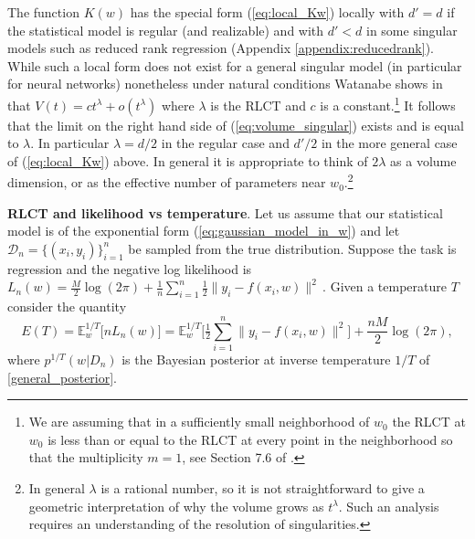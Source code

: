 \documentclass{article} %
\begin{document}
The function $K(w)$ has the special form (\ref{eq:local_Kw}) locally with $d' = d$ if the statistical model is regular (and realizable) and with $d' < d$ in some singular models such as reduced rank regression (Appendix \ref{appendix:reducedrank}). While such a local form does not exist for a general singular model (in particular for neural networks) nonetheless under natural conditions Watanabe shows in \citet[Theorem 7.1]{watanabe_algebraic_2009} that
$
V(t) = c t^\lambda + o( t^\lambda)
$
where $\lambda$ is the RLCT and $c$ is a constant.\footnote{We are assuming that in a sufficiently small neighborhood of $w_0$ the RLCT at $w_0$ is less than or equal to the RLCT at every point in the neighborhood so that the multiplicity $m = 1$, see Section 7.6 of \citep{watanabe_algebraic_2009}.} It follows that the limit on the right hand side of  (\ref{eq:volume_singular}) exists and is equal to $\lambda$. In particular $\lambda = d/2$ in the regular case and $d'/2$ in the more general case of (\ref{eq:local_Kw}) above. In general it is appropriate to think of $2 \lambda$ as a volume dimension, or as the effective number of parameters near $w_0$.\footnote{In general $\lambda$ is a rational number, so it is not straightforward to give a geometric interpretation of why the volume grows as $t^\lambda$. Such an analysis requires an understanding of the resolution of singularities.}


\textbf{RLCT and likelihood vs temperature}. Let us assume that our statistical model is of the exponential form  (\ref{eq:gaussian_model_in_w}) and let $\mathcal D_n = \{ (x_i,y_i) \}_{i=1}^n$ be sampled from the true distribution. Suppose the task is regression and the negative log likelihood is
$
L_n(w) = \frac{M}{2} \log(2\pi) + \frac{1}{n} \sum_{i=1}^n \frac{1}{2} \| y_i - f(x_i,w) \|^2\,.
$
Given a temperature $T$ consider the quantity
$$
E(T) = \mathbb{E}^{1/T}_w\big[nL_n(w) \big] = \mathbb{E}_w^{1/T}\Big[ \tfrac{1}{2} \sum_{i=1}^n \| y_i - f(x_i, w) \|^2 \Big] + \frac{nM}{2} \log(2\pi),
$$
where $p^{1/T}(w|D_n)$ is the Bayesian posterior at inverse temperature $1/T$ of \ref{general_posterior}.
\end{document}
